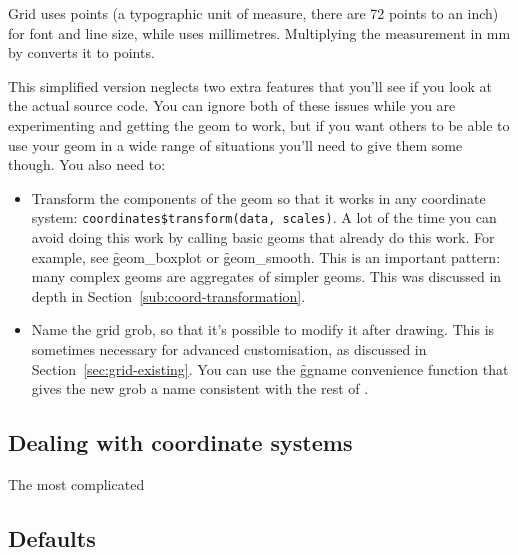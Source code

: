 % 

Grid uses points (a typographic unit of measure, there are 72 points to an inch) for font and line size, while \ggplot uses millimetres.  Multiplying the   measurement in mm by  converts it to points.  

This simplified version neglects two extra features that you'll see if you look at the actual source code.  You can ignore both of these issues while you are experimenting and getting the geom to work, but if you want others to be able to use your geom in a wide range of situations you'll need to give them some though.  You also need to:

\begin{itemize}
  \item Transform the components of the geom so that it works in any coordinate system: \verb|coordinates$transform(data, scales)|.  A lot of the time you can avoid doing this work by calling basic geoms that already do this work.  For example, see \f{geom_boxplot} or \f{geom_smooth}.  This is an important pattern: many complex geoms are aggregates of simpler geoms.  This was discussed in depth in Section~\ref{sub:coord-transformation}.

  \item Name the grid grob, so that it's possible to modify it after drawing.  This is sometimes necessary for advanced customisation, as discussed in Section~\ref{sec:grid-existing}.  You can use the \f{ggname} convenience function that gives the new grob a name consistent with the rest of \ggplot.
\end{itemize}


\subsection{Dealing with coordinate systems}

The most complicated 

\subsection{Defaults}
\label{sub:defaults}

